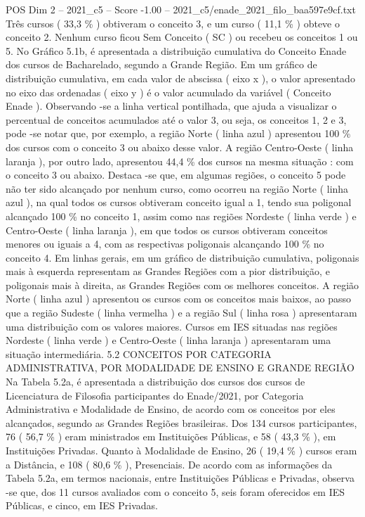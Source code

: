 \begin{textsample}{POS Dim 2 – 2021\_c5 – Score -1.00 – 2021\_c5/enade\_2021\_filo\_baa597e9cf.txt}
Três cursos ( 33,3 \% ) obtiveram o conceito 3, e um curso ( 11,1 \% ) obteve o conceito 2.
Nenhum curso ficou Sem Conceito ( SC ) ou recebeu os conceitos 1 ou 5.
No Gráfico 5.1b, é apresentada a distribuição cumulativa do Conceito Enade dos cursos de Bacharelado, segundo a Grande Região.
Em um gráfico de distribuição cumulativa, em cada valor de abscissa ( eixo x ), o valor apresentado no eixo das ordenadas ( eixo y ) é o valor acumulado da variável ( Conceito Enade ).
Observando -se a linha vertical pontilhada, que ajuda a visualizar o percentual de conceitos acumulados até o valor 3, ou seja, os conceitos 1, 2 e 3, pode -se notar que, por exemplo, a região Norte ( linha azul ) apresentou 100 \% dos cursos com o conceito 3 ou abaixo desse valor.
A região Centro-Oeste ( linha laranja ), por outro lado, apresentou 44,4 \% dos cursos na mesma situação : com o conceito 3 ou abaixo.
Destaca -se que, em algumas regiões, o conceito 5 pode não ter sido alcançado por nenhum curso, como ocorreu na região Norte ( linha azul ), na qual todos os cursos obtiveram conceito igual a 1, tendo sua poligonal alcançado 100 \% no conceito 1, assim como nas regiões Nordeste ( linha verde ) e Centro-Oeste ( linha laranja ), em que todos os cursos obtiveram conceitos menores ou iguais a 4, com as respectivas poligonais alcançando 100 \% no conceito 4.
Em linhas gerais, em um gráfico de distribuição cumulativa, poligonais mais à esquerda representam as Grandes Regiões com a pior distribuição, e poligonais mais à direita, as Grandes Regiões com os melhores conceitos.
A região Norte ( linha azul ) apresentou os cursos com os conceitos mais baixos, ao passo que a região Sudeste ( linha vermelha ) e a região Sul ( linha rosa ) apresentaram uma distribuição com os valores maiores.
Cursos em IES situadas nas regiões Nordeste ( linha verde ) e Centro-Oeste ( linha laranja ) apresentaram uma situação intermediária. 5.2 CONCEITOS POR CATEGORIA ADMINISTRATIVA, POR MODALIDADE DE ENSINO E GRANDE REGIÃO Na Tabela 5.2a, é apresentada a distribuição dos cursos dos cursos de Licenciatura de Filosofia participantes do Enade/2021, por Categoria Administrativa e Modalidade de Ensino, de acordo com os conceitos por eles alcançados, segundo as Grandes Regiões brasileiras.
Dos 134 cursos participantes, 76 ( 56,7 \% ) eram ministrados em Instituições Públicas, e 58 ( 43,3 \% ), em Instituições Privadas.
Quanto à Modalidade de Ensino, 26 ( 19,4 \% ) cursos eram a Distância, e 108 ( 80,6 \% ), Presenciais.
De acordo com as informações da Tabela 5.2a, em termos nacionais, entre Instituições Públicas e Privadas, observa -se que, dos 11 cursos avaliados com o conceito 5, seis foram oferecidos em IES Públicas, e cinco, em IES Privadas.

\end{textsample}
